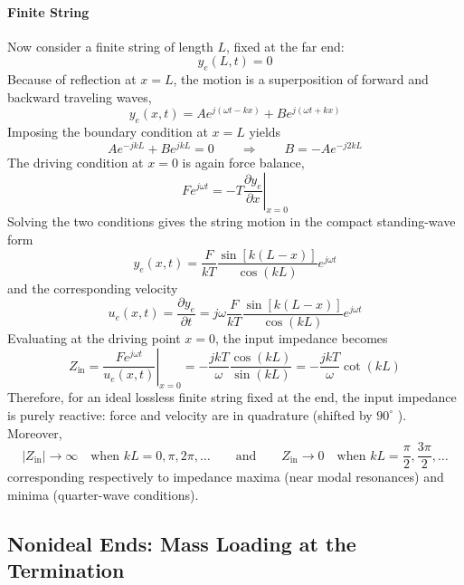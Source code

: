 \paragraph{Finite String} Now consider a finite string of length \( L \), fixed at the far end:
\[
y_e(L,t) = 0
\]
Because of reflection at \( x = L \), the motion is a superposition of forward and backward traveling waves,
\[
y_e(x,t) = A e^{j(\omega t-kx)} + B e^{j(\omega t + kx)}
\]
Imposing the boundary condition at \( x = L \) yields
\[
A e^{-jkL} + B e^{jkL} = 0
\qquad\Longrightarrow\qquad
B = -A e^{-j2kL}
\]
The driving condition at \( x = 0 \) is again force balance,
\[
F e^{j\omega t} = -T\left.\frac{\partial y_e}{\partial x}\right|_{x = 0}
\]
Solving the two conditions gives the string motion in the compact standing-wave form
\[
y_e(x,t) = \frac{F}{kT}\frac{\sin[k(L-x)]}{\cos(kL)}e^{j\omega t}
\]
and the corresponding velocity
\[
u_e(x,t) = \frac{\partial y_e}{\partial t}
 = j\omega\frac{F}{kT}\frac{\sin[k(L-x)]}{\cos(kL)}e^{j\omega t}
\]
Evaluating at the driving point \( x = 0 \), the input impedance becomes
\[
Z_{\mathrm{in}}
 = \left.\frac{F e^{j\omega t}}{u_e(x,t)}\right|_{x = 0}
 = -\frac{jkT}{\omega}\frac{\cos(kL)}{\sin(kL)}
 = -\frac{jkT}{\omega}\cot(kL)
\]
Therefore, for an ideal lossless finite string fixed at the end, the input impedance is purely reactive: force and velocity are in quadrature (shifted by \( 90^\circ \) ). Moreover,
\[
|Z_{\mathrm{in}}| \to \infty \quad \text{when } kL = 0,\pi,2\pi,\dots
\qquad\text{and}\qquad
Z_{\mathrm{in}} \to 0 \quad \text{when } kL = \frac{\pi}{2},\frac{3\pi}{2},\dots
\]
corresponding respectively to impedance maxima (near modal resonances) and minima (quarter-wave conditions).

\subsection{Nonideal Ends: Mass Loading at the Termination}

